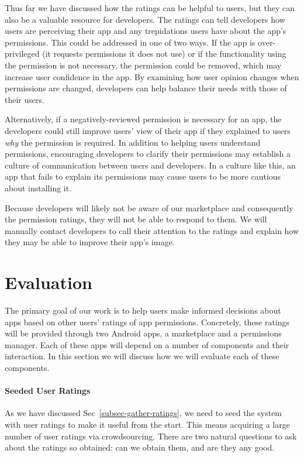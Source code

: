 \documentclass[11pt]{article}
\begin{document}
Thus far we have discussed how the ratings can be helpful to users, but
they can also be a valuable resource for developers. The ratings can tell
developers how users are perceiving their app and any trepidations users
have about the app's permissions. This could be addressed in one of two 
ways. If the app is over-privileged (it requests permissions it does not
use) or if the functionality using the permission is not necessary, the
permission could be removed, which may increase user confidence in the 
app. By examining how user opinion changes when permissions are changed,
developers can help balance their needs with those of their users. 

Alternatively, if a negatively-reviewed permission is necessary for
an app, the developers could still improve users' view of their app
if they explained to users \emph{why} the permission is required. In 
addition to helping users understand permissions, encouraging developers 
to clarify their permissions may establish a culture of communication
between users and developers. In a culture like this, an app that fails
to explain its permissions may cause users to be more cautious about 
installing it. 

Because developers will likely not be aware of our marketplace and 
consequently the permission ratings, they will not be able to respond 
to them. We will manually contact developers to call their attention
to the ratings and explain how they may be able to improve their 
app's image.


\section{Evaluation}
\label{sec-eval}

The primary goal of our work is to help users make informed decisions
about apps based on other users' ratings of app permissions.
Concretely, these ratings will be provided through two Android apps, a
marketplace and a permissions manager. Each of these apps will
depend on a number of components and their interaction. In this
section we will discuss how we will evaluate each of these components.

\paragraph{Seeded User Ratings}

As we have discussed Sec~\ref{subsec-gather-ratings}, we need to seed the system with user
ratings to make it useful from the start. This means acquiring a large
number of user ratings via crowdsourcing. There are two natural
questions to ask about the ratings so obtained: can we obtain them,
and are they any good.
\end{document}
